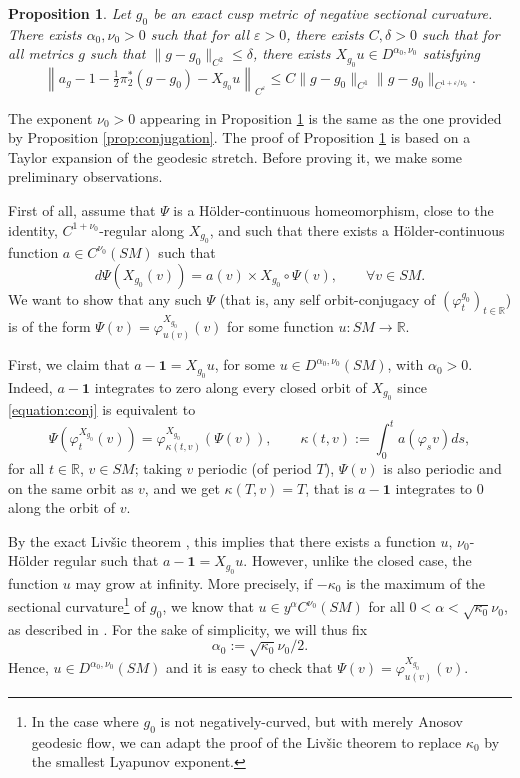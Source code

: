 \documentclass[10pt]{amsart}
\newcommand{\R}{\mathbb{R}}
\newcommand{\eps}{\varepsilon}
\theoremstyle{plain}
\newtheorem{proposition}{Proposition}[section]
\theoremstyle{definition}
\begin{document}
\begin{proposition}\label{thm:estimate-stretch}
Let $g_0$ be an exact cusp metric of negative sectional curvature. There exists $\alpha_0,\nu_0 > 0$ such that for all $\eps > 0$, there exists $C, \delta > 0$ such that for all metrics $g$ such that $\|g-g_0\|_{C^2} \leq \delta$, there exists $X_{g_0} u\in D^{\alpha_0,\nu_0}$ satisfying
\[
\left\| a_{g} - 1 - \tfrac{1}{2} \pi_2^\ast (g-g_0) - X_{g_0} u \right\|_{C^{\eps}} \leq C \| g-g_0 \|_{C^{1}} \| g-g_0\|_{C^{1+\eps/\nu_0}}.
\]
\end{proposition}

The exponent $\nu_0 > 0$ appearing in Proposition \ref{thm:estimate-stretch} is the same as the one provided by Proposition \ref{prop:conjugation}. The proof of Proposition \ref{thm:estimate-stretch} is based on a Taylor expansion of the geodesic stretch. Before proving it, we make some preliminary observations.

First of all, assume that $\Psi$ is a H\"older-continuous homeomorphism, close to the identity, $C^{1+\nu_0}$-regular along $X_{g_0}$, and such that there exists a H\"older-continuous function $a \in C^{\nu_0}(SM)$ such that
\begin{equation}
\label{equation:conj}
d \Psi (X_{g_0}(v))= a(v) \times X_{g_0}\circ \Psi(v), \qquad \forall v \in SM.
\end{equation}
{\color{black}We want to show that any such $\Psi$ (that is, any self orbit-conjugacy of $(\varphi^{g_0}_t)_{t \in \R}$) is of the form $\Psi(v) = \varphi^{X_{g_0}}_{u(v)}(v)$ for some function $u : SM \to \R$.}

First, we claim that $a-\mathbf{1} = X_{g_0}u$, for some $u \in D^{\alpha_0,\nu_0}(SM)$, with $\alpha_0 > 0$. {\color{black}Indeed, $a-\mathbf{1}$ integrates to zero along every closed orbit of $X_{g_0}$ since \eqref{equation:conj} is equivalent to
\[
\Psi(\varphi_t^{X_{g_0}}(v)) = \varphi^{X_{g_0}}_{\kappa(t,v)}(\Psi(v)), \qquad \kappa(t,v) := \int_0^t a(\varphi_s v) ds,
\]
for all $t \in \R$, $v \in SM$; taking $v$ periodic (of period $T$), $\Psi(v)$ is also periodic and on the same orbit as $v$, and we get $\kappa(T,v)=T$, that is $a-\mathbf{1}$ integrates to $0$ along the orbit of $v$.}

By the exact Liv\v{s}ic theorem \cite[Th.\,5]{Bonthonneau-Lefeuvre-19-1}, this implies that there exists a function $u$, $\nu_0$-Hölder regular such that $a-\mathbf{1}=X_{g_0}u$. However, unlike the closed case, the function $u$ may grow at infinity. More precisely, if $-\kappa_0$ is the maximum of the sectional curvature\footnote{In the case where $g_0$ is not negatively-curved, but with merely Anosov geodesic flow, we can adapt the proof of the Liv\v{s}ic theorem to replace $\kappa_0$ by the smallest Lyapunov exponent.} of $g_0$, we know that $u\in y^\alpha C^{\nu_0}(SM)$ for all $0<\alpha < \sqrt{\kappa_0}\nu_0$, as described in \cite[Th.\,5]{Bonthonneau-Lefeuvre-19-1}. For the sake of simplicity, we will thus fix
\begin{equation}\label{eq:def-alpha}
\alpha_0 := \sqrt{\kappa_0}\nu_0/2.
\end{equation}
{\color{black}Hence, $u \in D^{\alpha_0,\nu_0}(SM)$ and it is easy to check that $\Psi(v) = \varphi^{X_{g_0}}_{u(v)}(v)$.}
\end{document}
